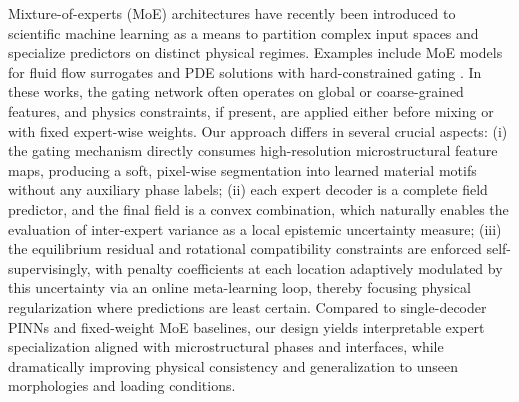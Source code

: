 \documentclass{article}
\begin{document}
Mixture-of-experts (MoE) architectures \cite{shazeer2017outrageously} have recently been introduced to scientific machine learning as a means to partition complex input spaces and specialize predictors on distinct physical regimes. Examples include MoE models for fluid flow surrogates \cite{wang2022mixture} and PDE solutions with hard-constrained gating \cite{fuchs2022moe}. In these works, the gating network often operates on global or coarse-grained features, and physics constraints, if present, are applied either before mixing or with fixed expert-wise weights. Our approach differs in several crucial aspects: (i) the gating mechanism directly consumes high-resolution microstructural feature maps, producing a soft, pixel-wise segmentation into learned material motifs without any auxiliary phase labels; (ii) each expert decoder is a complete field predictor, and the final field is a convex combination, which naturally enables the evaluation of inter-expert variance as a local epistemic uncertainty measure; (iii) the equilibrium residual and rotational compatibility constraints are enforced self-supervisingly, with penalty coefficients at each location adaptively modulated by this uncertainty via an online meta-learning loop, thereby focusing physical regularization where predictions are least certain. Compared to single-decoder PINNs and fixed-weight MoE baselines, our design yields interpretable expert specialization aligned with microstructural phases and interfaces, while dramatically improving physical consistency and generalization to unseen morphologies and loading conditions.
\end{document}
